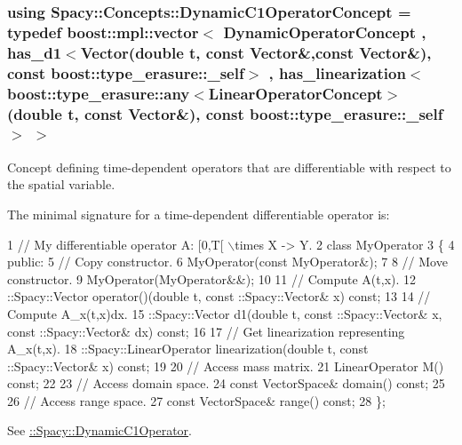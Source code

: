 \subsubsection[{Dynamic\+C1\+Operator\+Concept}]{\setlength{\rightskip}{0pt plus 5cm}using {\bf Spacy\+::\+Concepts\+::\+Dynamic\+C1\+Operator\+Concept} = typedef boost\+::mpl\+::vector$<$ {\bf Dynamic\+Operator\+Concept} , has\+\_\+d1$<${\bf Vector}(double t, const {\bf Vector}\&,const {\bf Vector}\&), const boost\+::type\+\_\+erasure\+::\+\_\+self$>$ , has\+\_\+linearization$<$boost\+::type\+\_\+erasure\+::any$<${\bf Linear\+Operator\+Concept}$>$(double t, const {\bf Vector}\&), const boost\+::type\+\_\+erasure\+::\+\_\+self$>$ $>$}\label{group__ConceptGroup_gaa7ef0ce2d66b0610035541b580564b11_gaa7ef0ce2d66b0610035541b580564b11}


Concept defining time-\/dependent operators that are differentiable with respect to the spatial variable. 

\label{group__ConceptGroup_gaa7ef0ce2d66b0610035541b580564b11_DynamicC1OperatorConceptAnchor}%
\hypertarget{group__ConceptGroup_gaa7ef0ce2d66b0610035541b580564b11_DynamicC1OperatorConceptAnchor}{}%
The minimal signature for a time-\/dependent differentiable operator is\+: 
\begin{DoxyCode}
1 // My differentiable operator A: [0,T[ \(\backslash\)times X -> Y.
2 class MyOperator
3 \{
4 public:
5   // Copy constructor.
6   MyOperator(const MyOperator&);
7 
8   // Move constructor.
9   MyOperator(MyOperator&&);
10 
11   // Compute A(t,x).
12   ::Spacy::Vector operator()(double t, const ::Spacy::Vector& x) const;
13 
14   // Compute A\_x(t,x)dx.
15   ::Spacy::Vector d1(double t, const ::Spacy::Vector& x, const ::Spacy::Vector& dx) const;
16 
17   // Get linearization representing A\_x(t,x).
18  ::Spacy::LinearOperator linearization(double t, const ::Spacy::Vector& x) const;
19 
20   // Access mass matrix.
21   LinearOperator M() const;
22 
23   // Access domain space.
24   const VectorSpace& domain() const;
25 
26   // Access range space.
27   const VectorSpace& range() const;
28 \};
\end{DoxyCode}


See \hyperlink{group__SpacyGroup_gabc9c830d2a7e020bcab097b10ee6f642_DynamicC1OperatorAnchor}{\+:\+:Spacy\+:\+:Dynamic\+C1\+Operator}. \hypertarget{group__ConceptGroup_ga30692db093ead5a1a074905363a2f043_ga30692db093ead5a1a074905363a2f043}{}
